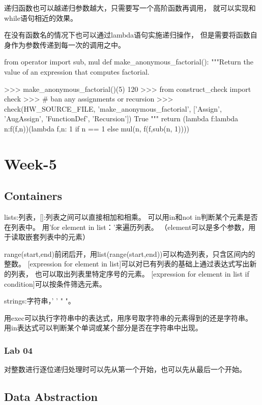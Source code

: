 \documentclass{ctexart}
\begin{document}
递归函数也可以越递归参数越大，只需要写一个高阶函数再调用，
就可以实现和while语句相近的效果。

在没有函数名的情况下也可以通过lambda语句实施递归操作，
但是需要将函数自身作为参数传递到每一次的调用之中。
\begin{python}
    from operator import sub, mul
    def make_anonymous_factorial():
    """Return the value of an expression that computes factorial.

    >>> make_anonymous_factorial()(5)
    120
    >>> from construct_check import check
    >>> # ban any assignments or recursion
    >>> check(HW_SOURCE_FILE, 'make_anonymous_factorial', ['Assign', 'AugAssign', 'FunctionDef', 'Recursion'])
    True
    """
    return (lambda f:lambda n:f(f,n))(lambda f,n: 1 if n == 1 else mul(n, f(f,sub(n, 1))))
\end{python}

\section{Week-5}

\subsection{Containers}

lists:列表，[]:列表之间可以直接相加和相乘。
可以用in和not in判断某个元素是否在列表中。
用'for element in list：'来遍历列表。
（element可以是多个参数，用于读取嵌套列表中的元素）

range(start,end)前闭后开，用list(range(start,end))可以构造列表，只含区间内的整数。
[expression for element in list]可以对已有列表的基础上通过表达式写出新的列表，
也可以取出列表里特定序号的元素。
[expression for element in list if condition]可以按条件筛选元素。

strings:字符串，' ' " "。

用exec可以执行字符串中的表达式，用序号取字符串的元素得到的还是字符串。
用in表达式可以判断某个单词或某个部分是否在字符串中出现。

\subsubsection{Lab 04}

对整数进行逐位递归处理时可以先从第一个开始，也可以先从最后一个开始。

\subsection{Data Abstraction}
\end{document}
